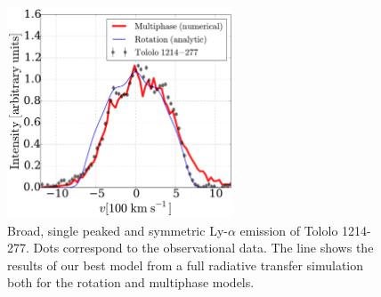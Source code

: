 \documentclass[a4,useAMS,usenatbib,usegraphicx]{mn2e}
\newcommand{\tol}{Tololo 1214-277}
\begin{document}
\begin{figure}
\begin{center}
\includegraphics[width=0.6\textwidth]{CLARA-TOL-main.pdf}
\caption{Broad, single peaked and symmetric Ly-$\alpha$ emission of \tol.
  Dots correspond to the observational data. The line shows the results
of our best model from a full radiative transfer simulation both for
the rotation and multiphase models.} 
\end{center}
\end{figure}
\end{document}
